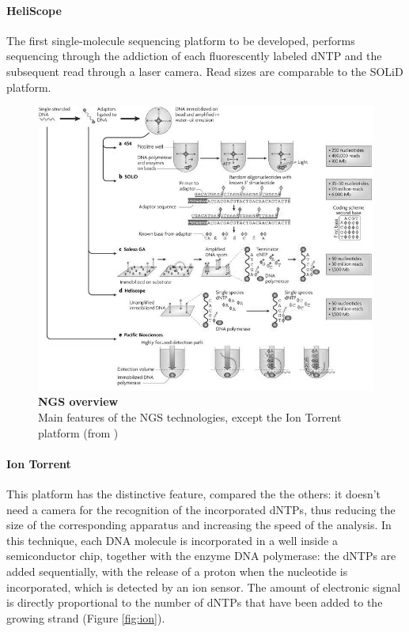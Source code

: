\paragraph{HeliScope} The first single-molecule sequencing platform to be developed, performs sequencing through the addiction of each fluorescently labeled dNTP and the subsequent read through a laser camera. Read sizes are comparable to the SOLiD platform.

\begin{figure}[!htb]
	\center
    \includegraphics[width=1\textwidth]{figures/Introduction/thesis_7}
	\caption{\label{fig:ngs}\textbf{NGS overview}\\
			Main features of the NGS technologies, except the Ion Torrent platform (from \cite{maclean2009application})}
\end{figure}

\paragraph{Ion Torrent} This platform has the distinctive feature, compared the the others: it doesn't need a camera for the recognition of the incorporated dNTPs, thus reducing the size of the corresponding apparatus and increasing the speed of the analysis. In this technique, each DNA molecule is incorporated in a well inside a semiconductor chip, together with the enzyme DNA polymerase: the dNTPs are added sequentially, with the release of a proton when the nucleotide is incorporated, which is detected by an ion sensor. The amount of electronic signal is directly proportional to the number of dNTPs that have been added to the growing strand (Figure \ref{fig:ion}). 

